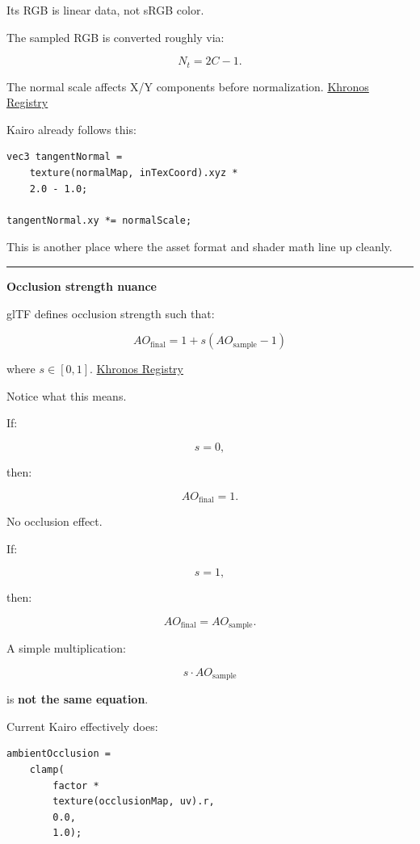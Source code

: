 Its RGB is linear data, not sRGB color.

The sampled RGB is converted roughly via:

\[
N_t=2C-1.
\]

The normal scale affects X/Y components before normalization. \href{https://registry.khronos.org/glTF/specs/2.0/glTF-2.0.pdf?utm_source=chatgpt.com}{Khronos Registry}

Kairo already follows this:

\begin{verbatim}
vec3 tangentNormal =
    texture(normalMap, inTexCoord).xyz *
    2.0 - 1.0;

tangentNormal.xy *= normalScale;
\end{verbatim}

This is another place where the asset format and shader math line up cleanly.

\begin{center}\rule{0.5\linewidth}{0.5pt}\end{center}

\textbf{Occlusion strength nuance}

glTF defines occlusion strength such that:

\[
\boxed{
AO_{\text{final}}
=
1+
s(AO_{\text{sample}}-1)
}
\]

where \(s\in[0,1]\). \href{https://registry.khronos.org/glTF/specs/2.0/glTF-2.0.html?initialSessionID=262-7493612-7323838&ld=ASXXSCTFRDirect&utm_source=chatgpt.com}{Khronos Registry}

Notice what this means.

If:

\[
s=0,
\]

then:

\[
AO_{\text{final}}=1.
\]

No occlusion effect.

If:

\[
s=1,
\]

then:

\[
AO_{\text{final}}
=
AO_{\text{sample}}.
\]

A simple multiplication:

\[
s\cdot AO_{\text{sample}}
\]

is \textbf{not the same equation}.

Current Kairo effectively does:

\begin{verbatim}
ambientOcclusion =
    clamp(
        factor *
        texture(occlusionMap, uv).r,
        0.0,
        1.0);
\end{verbatim}

